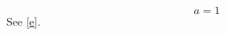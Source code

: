 \documentclass{aipproc}
\begin{document}
\aipextra
\begin{equation}a=1\label{e}\end{equation}
See \eqref{e}.
\end{document}
